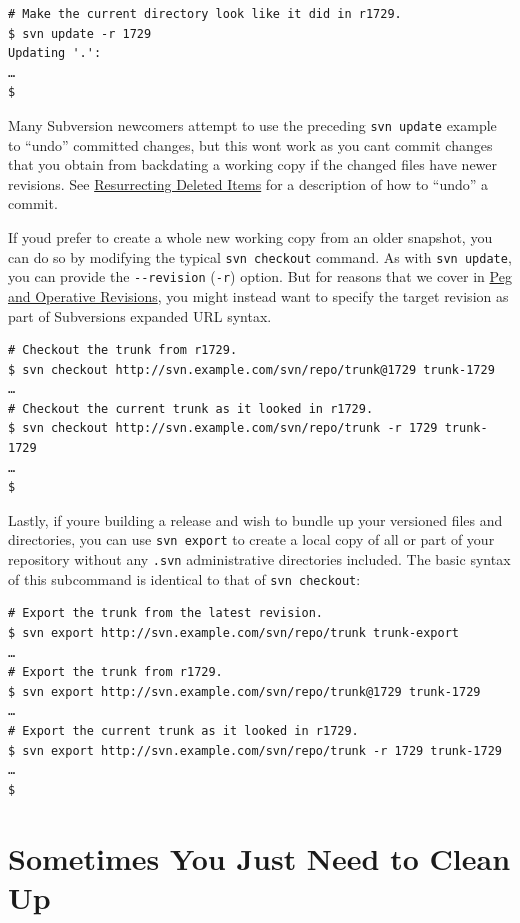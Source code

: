 \begin{verbatim}
# Make the current directory look like it did in r1729.
$ svn update -r 1729
Updating '.':
…
$
\end{verbatim}

Many Subversion newcomers attempt to use the preceding
\texttt{svn\ update} example to ``undo'' committed changes, but this
won\textquotesingle t work as you can\textquotesingle t commit changes
that you obtain from backdating a working copy if the changed files have
newer revisions. See
\hyperref[svn.branchmerge.basicmerging.resurrect]{Resurrecting Deleted
Items} for a description of how to ``undo'' a commit.

If you\textquotesingle d prefer to create a whole new working copy from
an older snapshot, you can do so by modifying the typical
\texttt{svn\ checkout} command. As with \texttt{svn\ update}, you can
provide the \texttt{-\/-revision} (\texttt{-r}) option. But for reasons
that we cover in \hyperref[svn.advanced.pegrevs]{Peg and Operative
Revisions}, you might instead want to specify the target revision as
part of Subversion\textquotesingle s expanded URL syntax.

\begin{verbatim}
# Checkout the trunk from r1729.
$ svn checkout http://svn.example.com/svn/repo/trunk@1729 trunk-1729
…
# Checkout the current trunk as it looked in r1729.
$ svn checkout http://svn.example.com/svn/repo/trunk -r 1729 trunk-1729
…
$
\end{verbatim}

Lastly, if you\textquotesingle re building a release and wish to bundle
up your versioned files and directories, you can use
\texttt{svn\ export} to create a local copy of all or part of your
repository without any \texttt{.svn} administrative directories
included. The basic syntax of this subcommand is identical to that of
\texttt{svn\ checkout}:

\begin{verbatim}
# Export the trunk from the latest revision.
$ svn export http://svn.example.com/svn/repo/trunk trunk-export
…
# Export the trunk from r1729.
$ svn export http://svn.example.com/svn/repo/trunk@1729 trunk-1729
…
# Export the current trunk as it looked in r1729. 
$ svn export http://svn.example.com/svn/repo/trunk -r 1729 trunk-1729
…
$
\end{verbatim}

\section{Sometimes You Just Need to Clean Up}\label{svn.tour.cleanup}

